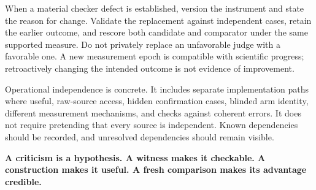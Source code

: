 When a material checker defect is established, version the instrument and state the reason for change. Validate the replacement against independent cases, retain the earlier outcome, and rescore both candidate and comparator under the same supported measure. Do not privately replace an unfavorable judge with a favorable one. A new measurement epoch is compatible with scientific progress; retroactively changing the intended outcome is not evidence of improvement.

Operational independence is concrete. It includes separate implementation paths where useful, raw-source access, hidden confirmation cases, blinded arm identity, different measurement mechanisms, and checks against coherent errors. It does not require pretending that every source is independent. Known dependencies should be recorded, and unresolved dependencies should remain visible.

\begin{thesisbox}
\textbf{A criticism is a hypothesis. A witness makes it checkable. A construction makes it useful. A fresh comparison makes its advantage credible.}
\end{thesisbox}
